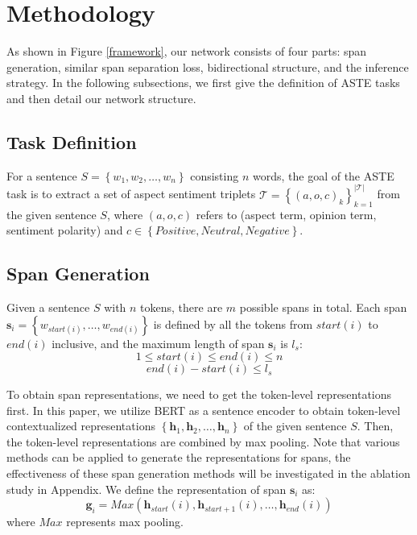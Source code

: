 \documentclass[11pt]{article}
\begin{document}
\section{Methodology}
As shown in Figure \ref{framework}, our network consists of four parts: span generation, similar span separation loss, bidirectional structure, and the inference strategy. In the following subsections, we first give the definition of ASTE tasks and then detail our network structure.

\subsection{Task Definition} 
For a sentence $S=\left\{w_{1},w_{2},\dots,w_{n}\right\}$ consisting $n$ words, the goal of the ASTE task is to extract a set of aspect sentiment triplets $\mathcal{T}=\left\{{(a,o,c)}_{k}\right\}_{k=1}^{|\mathcal{T}|}$ from the given sentence $S$, where $(a,o,c)$ refers to (aspect term, opinion term, sentiment polarity) and $c\in\left\{Positive,Neutral,Negative\right\}$.

\subsection{Span Generation} \label{span generation}
Given a sentence $S$ with $n$ tokens, there are $m$ possible spans in total. Each span $\mathbf{s}_{i}=\left\{w_{start(i)},\dots,w_{end(i)}\right\}$ is defined by all the tokens from $start(i)$ to $end(i)$ inclusive, and the maximum length of span $\mathbf{s}_{i}$ is $l_{s}$:
\begin{equation}
	1 \leq start(i) \leq end(i) \leq n
\end{equation}
\begin{equation}
	end(i) - start(i) \leq l_{s}
\end{equation}

To obtain span representations, we need to get the token-level representations first. In this paper, we utilize BERT \cite{devlin2018bert} as a sentence encoder to obtain token-level contextualized representations $\left\{\mathbf{h}_{1},\mathbf{h}_{2},\dots,\mathbf{h}_{n}\right\}$ of the given sentence $S$. Then, the token-level representations are combined by max pooling. Note that various methods can be applied to generate the representations for spans, the effectiveness of these span generation methods will be investigated in the ablation study in Appendix. We define the representation of span $\mathbf{s}_{i}$ as:
\begin{equation}
	\mathbf{g}_{i}=Max\left(\mathbf{h}_{start}(i), \mathbf{h}_{start+1}(i),\dots,\mathbf{h}_{end}(i)\right)
\end{equation}
where $Max$ represents max pooling.
\end{document}
